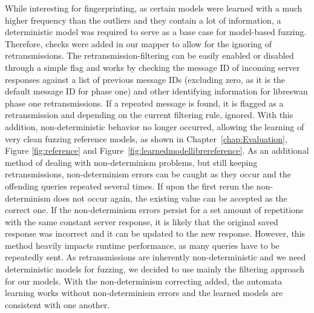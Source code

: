 While interesting for fingerprinting, as certain models were learned with a much higher frequency than the outliers and they contain a lot of information, a deterministic model was required to serve as a base case for model-based fuzzing. Therefore, checks were added in our mapper to allow for the ignoring of retransmissions. The retransmission-filtering can be easily enabled or disabled through a simple flag and works by checking the message ID of incoming server responses against a list of previous message IDs (excluding zero, as it is the default message ID for phase one) and other identifying information for libreswan phase one retransmissions. If a repeated message is found, it is flagged as a retransmission and depending on the current filtering rule, ignored. With this addition, non-deterministic behavior no longer occurred, allowing the learning of very clean fuzzing reference models, as shown in Chapter~\ref{chap:Evaluation}, Figure \ref{fig:reference} and Figure~\ref{fig:learnedmodellibrereference}. As an additional method of dealing with non-determinism problems, but still keeping retransmissions, non-determinism errors can be caught as they occur and the offending queries repeated several times. If upon the first rerun the non-determinism does not occur again, the existing value can be accepted as the correct one. If the non-determinism errors persist for a set amount of repetitions with the same constant server response, it is likely that the original saved response was incorrect and it can be updated to the new response. However, this method heavily impacts runtime performance, as many queries have to be repeatedly sent. As retransmissions are inherently non-deterministic and we need deterministic models for fuzzing, we decided to use mainly the filtering approach for our models. With the non-determinism correcting added, the automata learning works without non-determinism errors and the learned models are consistent with one another.
\cleardoublepage
